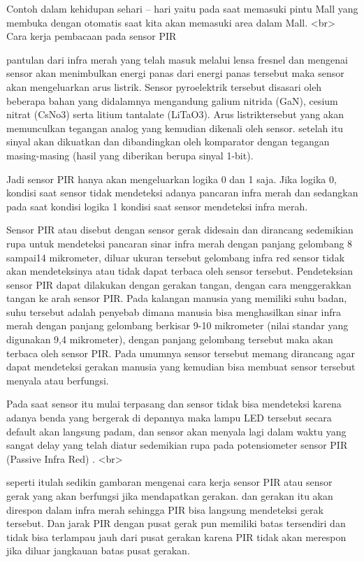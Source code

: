 Contoh dalam kehidupan sehari – hari yaitu pada saat memasuki pintu Mall yang membuka dengan otomatis saat kita akan memasuki area dalam Mall.
<br>
Cara kerja pembacaan pada sensor PIR

pantulan dari infra merah yang telah masuk melalui lensa fresnel dan mengenai sensor akan menimbulkan energi panas dari energi panas tersebut maka sensor akan mengeluarkan arus listrik.
Sensor pyroelektrik tersebut disasari oleh beberapa bahan yang didalamnya mengandung galium nitrida (GaN), cesium nitrat (CsNo3) serta litium tantalate (LiTaO3).
Arus listriktersebut yang akan memunculkan tegangan analog yang kemudian dikenali oleh sensor. setelah itu sinyal akan dikuatkan dan dibandingkan oleh komparator dengan tegangan masing-masing (hasil yang diberikan berupa sinyal 1-bit).

Jadi sensor PIR hanya akan mengeluarkan logika 0 dan 1 saja. Jika logika 0, kondisi saat sensor tidak mendeteksi adanya pancaran infra merah dan sedangkan pada saat kondisi logika 1 kondisi saat sensor mendeteksi infra merah.

Sensor PIR atau disebut dengan sensor gerak didesain dan dirancang sedemikian rupa untuk mendeteksi pancaran sinar infra merah dengan panjang gelombang 8 sampai14 mikrometer, diluar ukuran tersebut gelombang infra red sensor tidak akan mendeteksinya atau tidak dapat terbaca oleh sensor tersebut. Pendeteksian sensor PIR  dapat dilakukan dengan gerakan tangan, dengan cara menggerakkan tangan ke arah sensor PIR.
Pada kalangan manusia yang memiliki suhu badan, suhu tersebut adalah penyebab dimana manusia bisa menghasilkan sinar infra merah dengan panjang gelombang berkisar 9-10 mikrometer (nilai standar yang digunakan 9,4 mikrometer), dengan panjang gelombang tersebut maka akan terbaca oleh sensor PIR. Pada umumnya sensor tersebut memang dirancang agar dapat mendeteksi gerakan manusia yang kemudian bisa membuat sensor tersebut menyala atau berfungsi.

Pada saat sensor itu mulai terpasang dan sensor tidak bisa mendeteksi karena adanya benda yang bergerak di depannya maka lampu LED tersebut secara default akan langsung padam, dan sensor akan menyala lagi dalam waktu yang sangat delay yang telah diatur sedemikian rupa pada potensiometer sensor PIR (Passive Infra Red) .
<br>

seperti itulah sedikin gambaran mengenai cara kerja sensor PIR atau sensor gerak yang akan berfungsi jika mendapatkan gerakan. dan gerakan itu akan direspon dalam infra merah sehingga PIR bisa langsung mendeteksi gerak tersebut. Dan jarak PIR dengan pusat gerak pun memiliki batas tersendiri dan tidak bisa terlampau jauh dari pusat gerakan karena PIR tidak akan merespon jika diluar jangkauan batas pusat gerakan.

